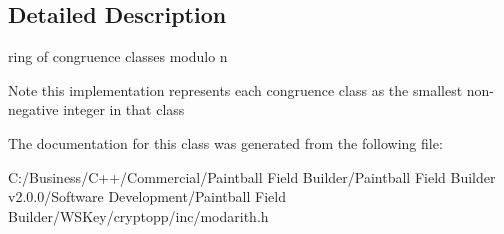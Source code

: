 \subsection{Detailed Description}
ring of congruence classes modulo n \begin{DoxyNote}{Note}
this implementation represents each congruence class as the smallest non-\/negative integer in that class 
\end{DoxyNote}


The documentation for this class was generated from the following file:\begin{DoxyCompactItemize}
\item 
C:/Business/C++/Commercial/Paintball Field Builder/Paintball Field Builder v2.0.0/Software Development/Paintball Field Builder/WSKey/cryptopp/inc/modarith.h\end{DoxyCompactItemize}
